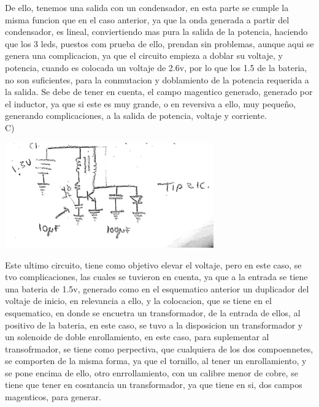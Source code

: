 \documentclass[12pt,a4paper]{article}
\begin{document}
De ello, tenemos una salida con un condensador, en esta parte se cumple la misma funcion que en el caso anterior, ya que la onda generada a partir del condensador, es lineal, conviertiendo mas pura la salida de la potencia, haciendo que los 3 leds, puestos com prueba de ello, prendan sin problemas, aunque aqui se genera una complicacion, ya que el circuito empieza  a doblar su voltaje, y potencia, cuando es colocada un voltaje de 2.6v, por lo que los 1.5 de la bateria, no son suficientes, para la conmutacion y doblamiento de la potencia requerida a la salida. Se debe de tener en cuenta, el campo magentico generado, generado por el inductor, ya que si este es muy grande, o en reversiva a ello, muy pequeño, generando complicaciones, a la salida de potencia, voltaje y corriente.\\

C)\\

\begin{center}
\includegraphics[width=9cm]{esquema3.jpeg}
\end{center}

Este ultimo circuito, tiene como objetivo elevar el voltaje, pero en este caso, se tvo complicaciones, las cuales se tuvieron en cuenta, ya que a la entrada se tiene una bateria de 1.5v, generado como en el esquematico anterior un duplicador del voltaje de inicio, en relevancia a ello, y la colocacion, que se tiene en el esquematico, en donde se encuetra un transformador, de la entrada de ellos, al positivo de la bateria, en este caso, se tuvo a la disposicion un transformador y un solenoide de doble enrollamiento, en este caso, para suplementar al transofrmador, se tiene como perpectiva, que cualquiera de los dos compoennetes, se comporten de la misma forma, ya que el tornillo, al tener un enrollamiento, y se pone encima de ello, otro enrrollamiento, con un calibre menor de cobre, se tiene que tener en cosntancia un transformador, ya que tiene en si, dos campos magenticos, para generar.\\
\end{document}
